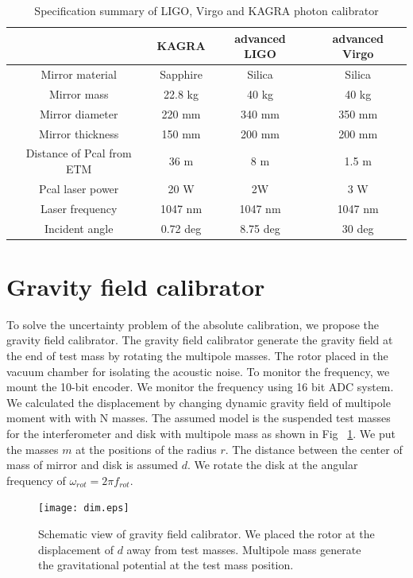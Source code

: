 \documentclass[A4]{spie}  %
\begin{document}
\begin{table}
\begin{center}
\caption{Specification summary of LIGO, Virgo and KAGRA photon calibrator\label{pcal}}
\footnotesize
\begin{tabular}{cccc}
\hline
& KAGRA& advanced LIGO& advanced Virgo \\
\hline
Mirror material & Sapphire & Silica & Silica \\
 Mirror mass & 22.8 kg & 40 kg & 40 kg \\
  Mirror diameter & 220 mm & 340 mm & 350 mm \\
    Mirror thickness & 150 mm & 200 mm & 200 mm \\
 Distance of Pcal from ETM & 36 m & 8 m & 1.5 m \\
  Pcal laser power & 20 W & 2W & 3 W \\
  Laser frequency & 1047 nm & 1047 nm &1047 nm\\
  Incident angle& 0.72 deg & 8.75 deg &30 deg \\
  \hline
\end{tabular}
\end{center}
\end{table}

\section{Gravity field calibrator} \label{sec:Gcal}
To solve the uncertainty problem of the absolute calibration, we propose the gravity field calibrator. The gravity field calibrator generate the gravity field at the end of test mass by rotating the multipole masses. The rotor placed in the vacuum chamber for isolating the acoustic noise. To monitor the frequency, we mount the 10-bit encoder. We monitor the frequency using 16 bit ADC system.
We calculated the displacement by changing dynamic gravity field of multipole moment with with N masses.
The assumed model is the suspended test masses for the interferometer and disk with multipole mass as shown in Fig ~\ref{fig:dim}.
We put the masses $m$ at the positions of the radius $r$. The distance between the center of mass of mirror and disk is assumed $d$.
We rotate the disk at the angular frequency of $\omega_{rot}=2\pi f_{rot}$.

\begin{figure}
\begin{center}
\texttt{[image: dim.eps]}
\caption{Schematic view of gravity field calibrator. We placed the rotor at the displacement of $d$ away from test masses. Multipole mass generate the gravitational potential at the test mass position.}
\label{fig:dim}
\end{center}
\end{figure}
\end{document}
